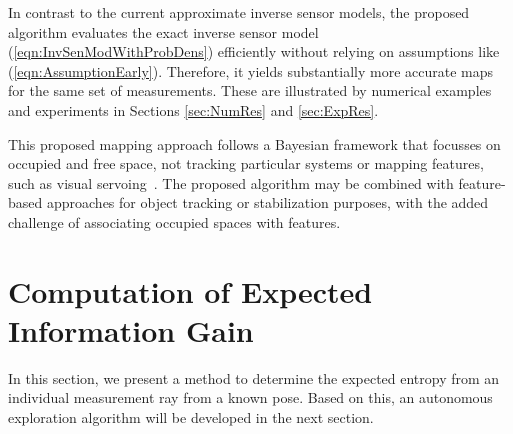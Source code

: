 \documentclass[smallextended]{svjour3}       %
\newcommand{\refeqn}[1]{(\ref{eqn:#1})}
\begin{document}
In contrast to the current approximate inverse sensor models, the proposed algorithm evaluates the exact inverse sensor model \refeqn{InvSenModWithProbDens} efficiently without relying on assumptions like \refeqn{AssumptionEarly}. Therefore, it yields substantially more accurate maps for the same set of measurements. These are illustrated by numerical examples and experiments in Sections \ref{sec:NumRes} and \ref{sec:ExpRes}.

This proposed mapping approach follows a Bayesian framework that focusses on occupied and free space, not tracking particular systems or mapping features, such as visual servoing~\cite{ChiDinChe14}. The proposed algorithm may be combined with feature-based approaches for object tracking or stabilization purposes, with the added challenge of associating occupied spaces with features.


\section{Computation of Expected Information Gain}
\label{sec:ExpectedInfoGain}

In this section, we present a method to determine the expected entropy from an individual measurement ray from a known pose. Based on this, an autonomous exploration algorithm will be developed in the next section.

\end{document}
